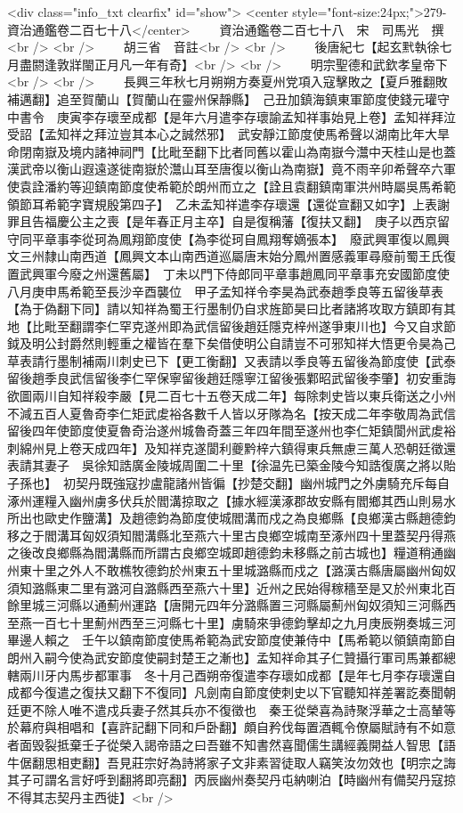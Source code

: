 <div class="info_txt clearfix" id="show">
<center style="font-size:24px;">279-資治通鑑卷二百七十八</center>
  　　資治通鑑卷二百七十八　宋　司馬光　撰<br />
<br />
　　胡三省　音註<br />
<br />
　　後唐紀七【起玄黓執徐七月盡閼逢敦牂閩正月凡一年有奇】<br />
<br />
　　明宗聖德和武欽孝皇帝下<br />
<br />
　　長興三年秋七月朔朔方奏夏州党項入寇擊敗之【夏戶雅翻敗補邁翻】追至賀蘭山【賀蘭山在靈州保靜縣】　己丑加鎮海鎮東軍節度使錢元瓘守中書令　庚寅李存瓌至成都【是年六月遣李存瓌諭孟知祥事始見上卷】孟知祥拜泣受詔【孟知祥之拜泣豈其本心之誠然邪】　武安靜江節度使馬希聲以湖南比年大旱命閉南嶽及境内諸神祠門【比毗至翻下比者同舊以霍山為南嶽今灊中天桂山是也蓋漢武帝以衡山遐遠遂徙南嶽於灊山耳至唐復以衡山為南嶽】竟不雨辛卯希聲卒六軍使袁詮潘約等迎鎮南節度使希範於朗州而立之【詮且袁翻鎮南軍洪州時屬吳馬希範領節耳希範字寶規殷第四子】　乙未孟知祥遣李存瓌還【還從宣翻又如字】上表謝罪且告福慶公主之喪【是年春正月主卒】自是復稱藩【復扶又翻】　庚子以西京留守同平章事李從珂為鳳翔節度使【為李從珂自鳳翔奪嫡張本】　廢武興軍復以鳳興文三州隸山南西道【鳳興文本山南西道巡屬唐末始分鳳州置感義軍尋廢前蜀王氏復置武興軍今廢之州還舊屬】　丁未以門下侍郎同平章事趙鳳同平章事充安國節度使　八月庚申馬希範至長沙辛酉襲位　甲子孟知祥令李昊為武泰趙季良等五留後草表【為于偽翻下同】請以知祥為蜀王行墨制仍自求旌節昊曰比者諸將攻取方鎮即有其地【比毗至翻謂李仁罕克遂州即為武信留後趙廷隱克梓州遂爭東川也】今又自求節鉞及明公封爵然則輕重之權皆在羣下矣借使明公自請豈不可邪知祥大悟更令昊為己草表請行墨制補兩川刺史已下【更工衡翻】又表請以季良等五留後為節度使【武泰留後趙季良武信留後李仁罕保寧留後趙廷隱寧江留後張鄴昭武留後李肇】初安重誨欲圖兩川自知祥殺李嚴【見二百七十五卷天成二年】每除刺史皆以東兵衛送之小州不減五百人夏魯奇李仁矩武䖍裕各數千人皆以牙隊為名【按天成二年李敬周為武信留後四年使節度使夏魯奇治遂州城魯奇蓋三年四年間至遂州也李仁矩鎮閬州武䖍裕刺綿州見上卷天成四年】及知祥克遂閬利夔黔梓六鎮得東兵無慮三萬人恐朝廷徵還表請其妻子　吳徐知誥廣金陵城周圍二十里【徐温先已築金陵今知誥復廣之將以貽子孫也】　初契丹既強寇抄盧龍諸州皆徧【抄楚交翻】幽州城門之外虜騎充斥每自涿州運糧入幽州虜多伏兵於閻溝掠取之【據水經漢涿郡故安縣有閻鄉其西山則易水所出也歐史作鹽溝】及趙德鈞為節度使城閻溝而戍之為良鄉縣【良鄉漢古縣趙德鈞移之于閻溝耳匈奴須知閻溝縣北至燕六十里古良鄉空城南至涿州四十里蓋契丹得燕之後改良鄉縣為閻溝縣而所謂古良鄉空城即趙德鈞未移縣之前古城也】糧道稍通幽州東十里之外人不敢樵牧德鈞於州東五十里城潞縣而戍之【潞漢古縣唐屬幽州匈奴須知潞縣東二里有潞河自潞縣西至燕六十里】近州之民始得稼穡至是又於州東北百餘里城三河縣以通薊州運路【唐開元四年分潞縣置三河縣屬薊州匈奴須知三河縣西至燕一百七十里薊州西至三河縣七十里】虜騎來爭德鈞擊却之九月庚辰朔奏城三河畢邊人賴之　壬午以鎮南節度使馬希範為武安節度使兼侍中【馬希範以領鎮南節自朗州入嗣今使為武安節度使嗣封楚王之漸也】孟知祥命其子仁贊攝行軍司馬兼都總轄兩川牙内馬步都軍事　冬十月己酉朔帝復遣李存瓌如成都【是年七月李存瓌還自成都今復遣之復扶又翻下不復同】凡劍南自節度使刺史以下官聽知祥差署訖奏聞朝廷更不除人唯不遣戍兵妻子然其兵亦不復徵也　秦王從榮喜為詩聚浮華之士高輦等於幕府與相唱和【喜許記翻下同和戶卧翻】頗自矜伐每置酒輒令僚屬賦詩有不如意者面毁裂抵棄壬子從榮入謁帝語之曰吾雖不知書然喜聞儒生講經義開益人智思【語牛倨翻思相吏翻】吾見莊宗好為詩將家子文非素習徒取人竊笑汝勿效也【明宗之誨其子可謂名言好呼到翻將即亮翻】丙辰幽州奏契丹屯納喇泊【時幽州有備契丹寇掠不得其志契丹主西徙】<br />
